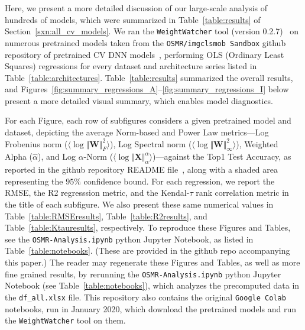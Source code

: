 Here, we present a more detailed discussion of our large-scale analysis of hundreds of models, which were summarized in Table~\ref{table:results} of Section~\ref{sxn:all_cv_models}. 
We ran the \texttt{WeightWatcher} tool (version 0.2.7)~\cite{weightwatcher_package}
on numerous pretrained models taken from the \texttt{OSMR/imgclsmob Sandbox} github repository of pretrained CV DNN models~\cite{osmr},   
performing OLS (Ordinary Least Squares) regressions for every dataset and architecture series listed in Table~\ref{table:architectures}.
Table~\ref{table:results} summarized the overall results, and Figures~\ref{fig:summary_regressions_A}--\ref{fig:summary_regressions_I} below present a more detailed visual summary, which enables model diagnostics.

For each Figure, each row of subfigures considers a given pretrained model and dataset, depicting the average Norm-based and Power Law 
metrics---Log Frobenius norm
          ($\langle\log\Vert\mathbf{W}\Vert^{2}_{F}\rangle$),
          Log Spectral norm
          ($\langle\log\Vert\mathbf{W}\Vert^{2}_{\infty}\rangle$),
          Weighted Alpha
          ($\hat{\alpha}$),
          and Log $\alpha$-Norm
          ($\langle\log\Vert\mathbf{X}\Vert^{\alpha}_{\alpha}\rangle$)---against 
the Top1 Test Accuracy, as reported in the github repository README file~\cite{osmr}, along with a shaded area representing the $95\%$ confidence bound.
For each regression, we report the RMSE, the R2 regresssion metric, and the Kendal-$\tau$ rank correlation metric in the title of each subfigure.
We also present these same numerical values in Table~\ref{table:RMSEresults}, Table~\ref{table:R2results}, and Table~\ref{table:Ktauresults}, respectively.
To reproduce these Figures and Tables, see the \texttt{OSMR-Analysis.ipynb} python Jupyter Notebook, as listed in Table~\ref{table:notebooks}.
(These are provided in the github repo accompanying this paper.)
The reader may regenerate these Figures and Tables, as well as more fine grained results, by rerunning the \texttt{OSMR-Analysis.ipynb} python Jupyter Notebook (see Table~\ref{table:notebooks}), which analyzes the precomputed data in the \texttt{df\_all.xlsx} file. 
This repository also contains the original \texttt{Google Colab} notebooks, run in January 2020, which download the pretrained models and run the \texttt{WeightWatcher} tool on them.
